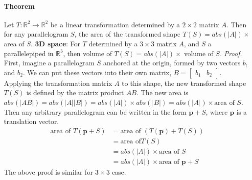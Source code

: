 \documentclass[../linear-algebra.tex]{subfiles}
\begin{document}
\paragraph{Theorem} Let $T:\mathbb{R}^2\to\mathbb{R}^2$ be a linear transformation determined by a $2 \times 2$ matrix $A$.
Then for any parallelogram $S$, the area of the transformed shape $T(S) = abs(|A|) \times$ area of $S$.\newline
\textbf{3D space}: For $T$ determined by a $3 \times 3$ matrix $A$, and $S$ a parallelepiped in $\mathbb{R}^3$,
then volume of $T(S) = abs(|A|) \times$ volume of $S$.\newline
\textit{Proof.}
First, imagine a parallelogram $S$ anchored at the origin, formed by two vectors $b_1$ and $b_2$.
We can put these vectors into their own matrix, $B = \begin{bmatrix} b_1 & b_2 \end{bmatrix}$.
Applying the transformation matrix $A$ to this shape, the new transformed shape $T(S)$ is defined by the matrix product $AB$.
The new area is $abs(|AB|) = abs(|A||B|) = abs(|A|) \times abs(|B|) = abs(|A|) \times \text{area of } S$.\newline
Then any arbitrary parallelogram can be written in the form $\mathbf{p} + S$,
where $\mathbf{p}$ is a translation vector.
\begin{align*}
    \text{area of }T(\mathbf{p} + S) &= \text{area of }(T(\mathbf{p}) + T(S)) \\
    &= \text{area of} T(S) \\
    &= abs(|A|) \times \text{area of }S \\
    &= abs(|A|) \times \text{area of }\mathbf{p} + S
\end{align*}
The above proof is similar for $3 \times 3$ case.
\end{document}
